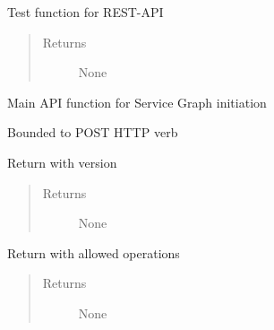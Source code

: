 \documentclass[letterpaper,10pt,english]{sphinxmanual}
\begin{document}
\begin{fulllineitems}
\begin{fulllineitems}
\label{service/sas_API:escape.service.sas_API.ServiceRequestHandler.echo}
Test function for REST-API
\begin{quote}\begin{description}
\item[{Returns}] \leavevmode
None

\end{description}\end{quote}

\end{fulllineitems}


\begin{fulllineitems}
\label{service/sas_API:escape.service.sas_API.ServiceRequestHandler.sg}
Main API function for Service Graph initiation

Bounded to POST HTTP verb

\end{fulllineitems}


\begin{fulllineitems}
\label{service/sas_API:escape.service.sas_API.ServiceRequestHandler.version}
Return with version
\begin{quote}\begin{description}
\item[{Returns}] \leavevmode
None

\end{description}\end{quote}

\end{fulllineitems}


\begin{fulllineitems}
\label{service/sas_API:escape.service.sas_API.ServiceRequestHandler.operations}
Return with allowed operations
\begin{quote}\begin{description}
\item[{Returns}] \leavevmode
None

\end{description}\end{quote}

\end{fulllineitems}


\end{fulllineitems}
\end{document}
